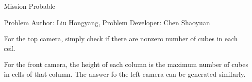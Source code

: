 \begin{Solution}{Mission Probable}

\begin{frame}{\ProblemName}

\small Problem Author: Liu Hongyang, Problem Developer: Chen Shaoyuan \par \vspace{0.3cm}

For the top camera, simply check if there are nonzero number of cubes in each ceil.

\par

For the front camera, the height of each column is the maximum number of cubes in cells of that column. The answer fo the left camera can be generated similarly.

\end{frame}

\end{Solution}
